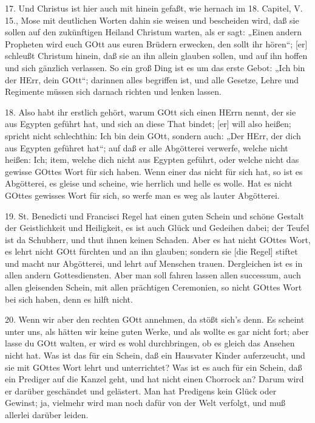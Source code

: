 17. Und Christus ist hier auch mit hinein gefaßt, wie hernach im 18. Capitel, V. 15., Mose mit deutlichen Worten dahin sie weisen und bescheiden wird, daß sie sollen auf den zukünftigen Heiland Christum warten, als er sagt: „Einen andern Propheten wird euch GOtt aus euren Brüdern erwecken, den sollt ihr hören“; [er] schleußt Christum hinein, daß sie an ihn allein glauben sollen, und auf ihn hoffen und sich gänzlich verlassen. So ein groß Ding ist es um das erste Gebot: „Ich bin der HErr, dein GOtt“; darinnen alles begriffen ist, und alle Gesetze, Lehre und Regimente müssen sich darnach richten und lenken lassen.

18. Also habt ihr erstlich gehört, warum GOtt sich einen HErrn nennt, der sie aus Egypten geführt hat, und sich an diese That bindet; [er] will also heißen; spricht nicht schlechthin: Ich bin dein GOtt, sondern auch: „Der HErr, der dich aus Egypten geführet hat“; auf daß er alle Abgötterei verwerfe, welche nicht heißen: Ich; item, welche dich nicht aus Egypten geführt, oder welche nicht das gewisse GOttes Wort für sich haben. Wenn einer das nicht für sich hat, so ist es Abgötterei, es gleise und scheine, wie herrlich und helle es wolle. Hat es nicht GOttes gewisses Wort für sich, so werfe man es weg als lauter Abgötterei.

19. St. Benedicti und Francisci Regel hat einen guten Schein und schöne Gestalt der Geistlichkeit und Heiligkeit, es ist auch Glück und Gedeihen dabei; der Teufel ist da Schubherr, und thut ihnen keinen Schaden. Aber es hat nicht GOttes Wort, es lehrt nicht GOtt fürchten und an ihn glauben; sondern sie [die Regel] stiftet und macht nur Abgötterei, und lehrt auf Menschen trauen. Dergleichen ist es in allen andern Gottesdiensten. Aber man soll fahren lassen allen successum, auch allen gleisenden Schein, mit allen prächtigen Ceremonien, so nicht GOttes Wort bei sich haben, denn es hilft nicht.

20. Wenn wir aber den rechten GOtt annehmen, da stößt sich's denn. Es scheint unter uns, als hätten wir keine guten Werke, und als wollte es gar nicht fort; aber lasse du GOtt walten, er wird es wohl durchbringen, ob es gleich das Ansehen nicht hat. Was ist das für ein Schein, daß ein Hausvater Kinder auferzeucht, und sie mit GOttes Wort lehrt und unterrichtet? Was ist es auch für ein Schein, daß ein Prediger auf die Kanzel geht, und hat nicht einen Chorrock an? Darum wird er darüber geschändet und gelästert. Man hat Predigens kein Glück oder Gewinst; ja, vielmehr wird man noch dafür von der Welt verfolgt, und muß allerlei darüber leiden.

